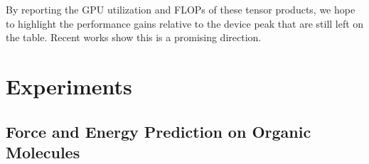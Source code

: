 \documentclass{article}
\theoremstyle{definition}
\theoremstyle{remark}
\begin{document}
By reporting the GPU utilization and FLOPs of these tensor products, we hope to highlight the performance gains relative to the device peak that are still left on the table. Recent works \citep{cuEquivariance, openEquivariance, firoz2025optimizingdatadistributionkernel, tan2025highperformancetraininginferencedeep} show this is a promising direction.














    

\section{Experiments}
\label{sec:experiments}

\subsection{Force and Energy Prediction on Organic Molecules}
\label{sec:force-energy-prediction}
\end{document}
